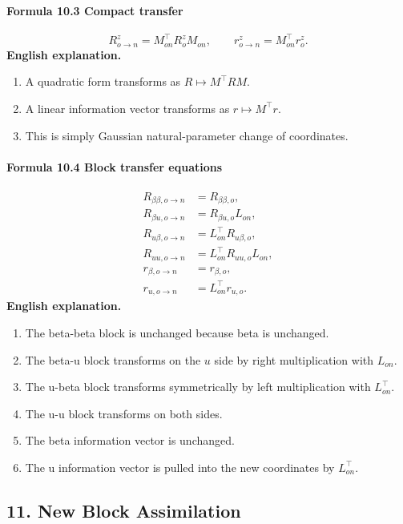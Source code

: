 \documentclass[12pt]{article}
\begin{document}
\paragraph{Formula 10.3 Compact transfer}
\[
R_{o\rightarrow n}^z=M_{on}^\top R_o^zM_{on},
\qquad
r_{o\rightarrow n}^z=M_{on}^\top r_o^z.
\]
\textbf{English explanation.}
\begin{enumerate}[leftmargin=2em]
\item A quadratic form transforms as \(R\mapsto M^\top RM\).
\item A linear information vector transforms as \(r\mapsto M^\top r\).
\item This is simply Gaussian natural-parameter change of coordinates.
\end{enumerate}

\paragraph{Formula 10.4 Block transfer equations}
\[
\begin{aligned}
R_{\beta\beta,o\rightarrow n}&=R_{\beta\beta,o},\\
R_{\beta u,o\rightarrow n}&=R_{\beta u,o}L_{on},\\
R_{u\beta,o\rightarrow n}&=L_{on}^\top R_{u\beta,o},\\
R_{uu,o\rightarrow n}&=L_{on}^\top R_{uu,o}L_{on},\\
r_{\beta,o\rightarrow n}&=r_{\beta,o},\\
r_{u,o\rightarrow n}&=L_{on}^\top r_{u,o}.
\end{aligned}
\]
\textbf{English explanation.}
\begin{enumerate}[leftmargin=2em]
\item The beta-beta block is unchanged because beta is unchanged.
\item The beta-u block transforms on the \(u\) side by right multiplication with \(L_{on}\).
\item The u-beta block transforms symmetrically by left multiplication with \(L_{on}^\top\).
\item The u-u block transforms on both sides.
\item The beta information vector is unchanged.
\item The u information vector is pulled into the new coordinates by \(L_{on}^\top\).
\end{enumerate}

\subsection{11. New Block Assimilation}
\end{document}
